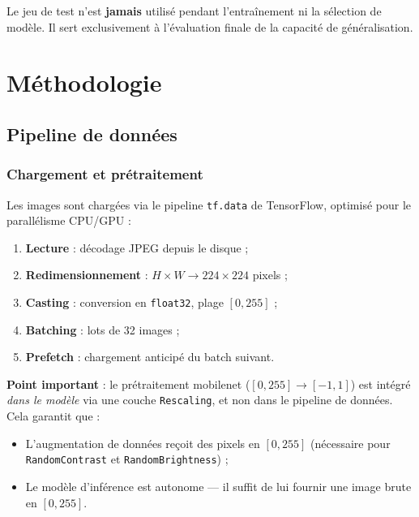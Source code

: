 \documentclass[12pt, a4paper, twoside]{report}
\begin{document}
Le jeu de test n'est \textbf{jamais} utilisé pendant l'entraînement ni la sélection de modèle. Il sert exclusivement à l'évaluation finale de la capacité de généralisation.


\chapter{Méthodologie}
\label{chap:methode}

\section{Pipeline de données}

\subsection{Chargement et prétraitement}

Les images sont chargées via le pipeline \texttt{tf.data} de TensorFlow, optimisé pour le parallélisme CPU/GPU :

\begin{enumerate}
    \item \textbf{Lecture} : décodage JPEG depuis le disque ;
    \item \textbf{Redimensionnement} : $H \times W \rightarrow 224 \times 224$ pixels ;
    \item \textbf{Casting} : conversion en \texttt{float32}, plage $[0, 255]$ ;
    \item \textbf{Batching} : lots de 32 images ;
    \item \textbf{Prefetch} : chargement anticipé du batch suivant.
\end{enumerate}

\textbf{Point important} : le prétraitement mobilenet ($[0, 255] \rightarrow [-1, 1]$) est intégré \textit{dans le modèle} via une couche \texttt{Rescaling}, et non dans le pipeline de données. Cela garantit que :
\begin{itemize}
    \item L'augmentation de données reçoit des pixels en $[0, 255]$ (nécessaire pour \texttt{RandomContrast} et \texttt{RandomBrightness}) ;
    \item Le modèle d'inférence est autonome --- il suffit de lui fournir une image brute en $[0, 255]$.
\end{itemize}
\end{document}

